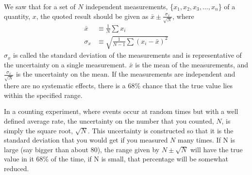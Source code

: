 We saw that for a set of $N$ independent measurements, \{$x_1, x_2, x_3, \dots, x_n$\} of a quantity, $x$, the quoted result should be given as $\bar x \pm \frac{\sigma_x}{\sqrt{N}}$, where
\begin{align}
\label{eqn:meanAndErrorOnMean}
\bar x &\equiv \frac{1}{N}\sum x_i \nonumber\\
\sigma_x &\equiv \sqrt{\frac{1}{N-1}\sum (x_i-\bar x)^2}
\end{align}
$\sigma_x$ is called the standard deviation of the measurements and is representative of the uncertainty on a single measurement. $\bar x$ is the mean of the measurements, and $\frac{\sigma_x}{\sqrt{N}}$ is the uncertainty on the mean. If the measurements are independent and there are no systematic effects, there is a 68\% chance that the true value lies within the specified range.

In a counting experiment, where events occur at random times but with a well defined average rate, the uncertainty on the number that you counted, $N$, is simply the square root, $\sqrt{N}$. This uncertainty is constructed so that it is the standard deviation that you would get if you measured $N$ many times. If N is large (say bigger than about 80), the range given by $N\pm \sqrt{N}$ will have the true value in it 68\% of the time, if N is small, that percentage will be somewhat reduced.
